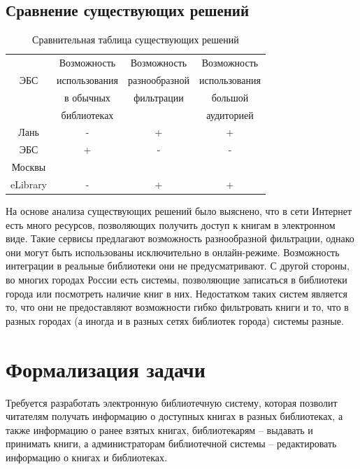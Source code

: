 \subsection{Сравнение существующих решений}
\begin{table} [h!]
	\caption{Сравнительная таблица существующих решений}
	\begin{center}
	\begin{tabular}{|c c c c|}
    \hline
            & Возможность & Возможность& Возможность \\
     ЭБС       & использования & разнообразной& использования \\
           & в обычных & фильтрации & большой  \\
           & библиотеках &  & аудиторией  \\
    \hline
    Лань     & - & + & + \\
    \hline
    ЭБС & +& -& -  \\
    Москвы & & &   \\
    \hline
    eLibrary & - & + & +  \\
    \hline
	\end{tabular}
	\end{center}
\end{table}

На основе анализа существующих решений было выяснено, что в сети Интернет есть много ресурсов, позволяющих получить доступ к книгам в электронном виде. Такие сервисы предлагают возможность разнообразной фильтрации, однако они могут быть использованы исключительно в онлайн-режиме. Возможность интеграции в реальные библиотеки они не предусматривают. С другой стороны, во многих городах России есть системы, позволяющие записаться в библиотеки города или посмотреть наличие книг в них. Недостатком таких систем является то, что они не предоставляют возможности гибко фильтровать книги и то, что в разных городах (а иногда и в разных сетях библиотек города) системы разные. 

\section{Формализация задачи}
Требуется разработать электронную библиотечную систему, которая позволит читателям получать информацию о доступных книгах в разных библиотеках, а также информацию о ранее взятых книгах, библиотекарям -- выдавать и принимать книги, а администраторам библиотечной системы -- редактировать информацию о книгах и библиотеках.

